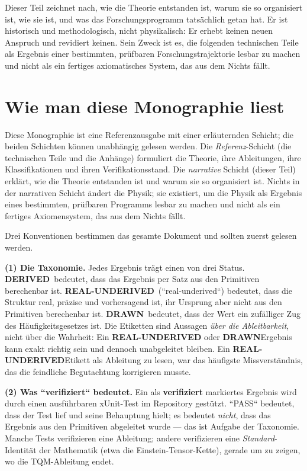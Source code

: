 \documentclass[10pt,twoside,openany]{book}
\newcommand{\derived}{\textbf{DERIVED}}
\newcommand{\realunder}{\textbf{REAL-UNDERIVED}}
\newcommand{\drawn}{\textbf{DRAWN}}
\begin{document}
Dieser Teil zeichnet nach, wie die Theorie entstanden ist, warum sie so organisiert ist,
wie sie ist, und was das Forschungsprogramm tatsächlich getan hat. Er ist historisch und
methodologisch, nicht physikalisch: Er erhebt keinen neuen Anspruch und revidiert keinen.
Sein Zweck ist es, die folgenden technischen Teile als Ergebnis einer bestimmten,
prüfbaren Forschungstrajektorie lesbar zu machen und nicht als ein fertiges axiomatisches
System, das aus dem Nichts fällt.

\chapter{Wie man diese Monographie liest}
\label{ch:reading}

Diese Monographie ist eine Referenzausgabe mit einer erläuternden Schicht; die beiden
Schichten können unabhängig gelesen werden. Die \emph{Referenz}-Schicht (die technischen
Teile und die Anhänge) formuliert die Theorie, ihre Ableitungen, ihre Klassifikationen und
ihren Verifikationsstand. Die \emph{narrative} Schicht (dieser Teil) erklärt, wie die
Theorie entstanden ist und warum sie so organisiert ist. Nichts in der narrativen Schicht
ändert die Physik; sie existiert, um die Physik als Ergebnis eines bestimmten, prüfbaren
Programms lesbar zu machen und nicht als ein fertiges Axiomensystem, das aus dem Nichts
fällt.

Drei Konventionen bestimmen das gesamte Dokument und sollten zuerst gelesen werden.

\textbf{(1) Die Taxonomie.} Jedes Ergebnis trägt einen von drei Status.
\derived\ bedeutet, dass das Ergebnis per Satz aus den Primitiven berechenbar ist.
\realunder\ (``real-underived``) bedeutet, dass die Struktur real, präzise und vorhersagend
ist, ihr Ursprung aber nicht aus den Primitiven berechenbar ist. \drawn\ bedeutet, dass der
Wert ein zufälliger Zug des Häufigkeitsgesetzes ist. Die Etiketten sind Aussagen \emph{über
die Ableitbarkeit}, nicht über die Wahrheit: Ein \realunder\- oder \drawn\-Ergebnis kann
exakt richtig sein und dennoch unabgeleitet bleiben. Ein \realunder\-Etikett als Ableitung
zu lesen, war das häufigste Missverständnis, das die feindliche Begutachtung korrigieren
musste.

\textbf{(2) Was ``verifiziert`` bedeutet.} Ein als \textbf{verifiziert} markiertes Ergebnis
wird durch einen ausführbaren xUnit-Test im Repository gestützt. ``PASS`` bedeutet, dass der
Test lief und seine Behauptung hielt; es bedeutet \emph{nicht}, dass das Ergebnis aus den
Primitiven abgeleitet wurde --- das ist Aufgabe der Taxonomie. Manche Tests verifizieren
eine Ableitung; andere verifizieren eine \emph{Standard}-Identität der Mathematik (etwa
die Einstein-Tensor-Kette), gerade um zu zeigen, wo die TQM-Ableitung endet.
\end{document}
